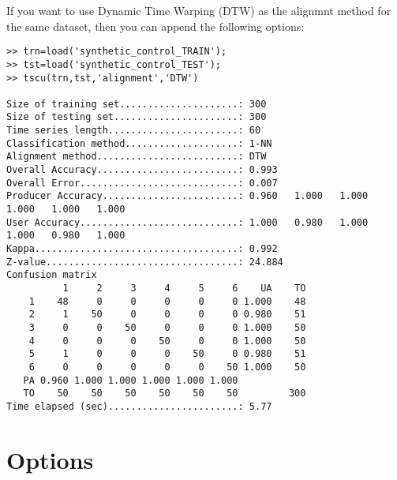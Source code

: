 \documentclass{article}
\begin{document}
If you want to use Dynamic Time Warping (DTW) as the alignmnt method for the same dataset, then you can append the following options:
\begin{scriptsize}
\begin{verbatim}
>> trn=load('synthetic_control_TRAIN');
>> tst=load('synthetic_control_TEST');
>> tscu(trn,tst,'alignment','DTW')

Size of training set.....................: 300
Size of testing set......................: 300
Time series length.......................: 60
Classification method....................: 1-NN
Alignment method.........................: DTW
Overall Accuracy.........................: 0.993   
Overall Error............................: 0.007   
Producer Accuracy........................: 0.960   1.000   1.000   1.000   1.000   1.000   
User Accuracy............................: 1.000   0.980   1.000   1.000   0.980   1.000   
Kappa....................................: 0.992   
Z-value..................................: 24.884  
Confusion matrix
          1     2     3     4     5     6    UA    TO 
    1    48     0     0     0     0     0 1.000    48 
    2     1    50     0     0     0     0 0.980    51 
    3     0     0    50     0     0     0 1.000    50 
    4     0     0     0    50     0     0 1.000    50 
    5     1     0     0     0    50     0 0.980    51 
    6     0     0     0     0     0    50 1.000    50 
   PA 0.960 1.000 1.000 1.000 1.000 1.000 
   TO    50    50    50    50    50    50         300 
Time elapsed (sec).......................: 5.77  
\end{verbatim}
\end{scriptsize}

\section{Options}
\end{document}
